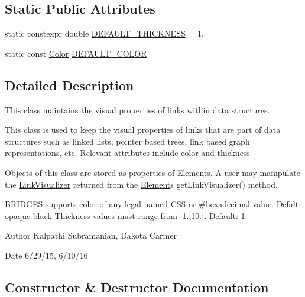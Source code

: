 \subsection*{Static Public Attributes}
\begin{DoxyCompactItemize}
\item 
static constexpr double \hyperlink{classbridges_1_1_link_visualizer_ab790c33080c769008114db34d5ec8950}{D\+E\+F\+A\+U\+L\+T\+\_\+\+T\+H\+I\+C\+K\+N\+E\+S\+S} = 1.
\item 
static const \hyperlink{classbridges_1_1_color}{Color} \hyperlink{classbridges_1_1_link_visualizer_a7698ad5b243041377d81152a339d1282}{D\+E\+F\+A\+U\+L\+T\+\_\+\+C\+O\+L\+O\+R}
\end{DoxyCompactItemize}


\subsection{Detailed Description}
This class maintains the visual properties of links within data structures. 

This class is used to keep the visual properties of links that are part of data structures such as linked lists, pointer based trees, link based graph representations, etc. Relevant attributes include color and thickness

Objects of this class are stored as properties of Elements. A user may manipulate the \hyperlink{classbridges_1_1_link_visualizer}{Link\+Visualizer} returned from the \hyperlink{classbridges_1_1_element}{Element}\textquotesingle{}s get\+Link\+Visualizer() method.

B\+R\+I\+D\+G\+E\+S supports color of any legal named C\+S\+S or \#hexadecimal value. Defalt\+: opaque black Thickness values must range from \mbox{[}1.,10.\mbox{]}. Default\+: 1.

\begin{DoxyAuthor}{Author}
Kalpathi Subramanian, Dakota Carmer 
\end{DoxyAuthor}
\begin{DoxyDate}{Date}
6/29/15, 6/10/16 
\end{DoxyDate}


\subsection{Constructor \& Destructor Documentation}
\hypertarget{classbridges_1_1_link_visualizer_a598a773822efc55c644462795faf534f}{}

